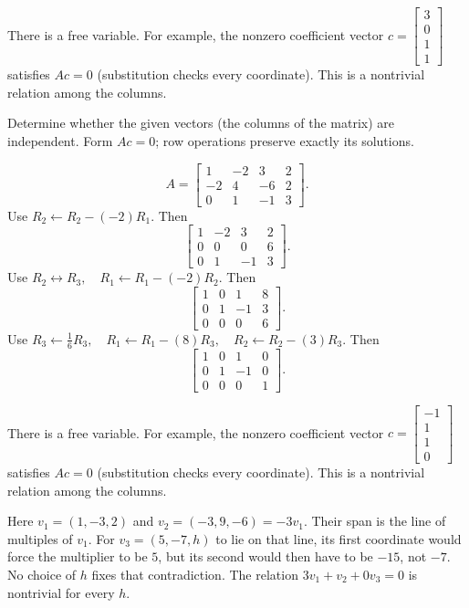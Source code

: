 There is a free variable. For example, the nonzero coefficient vector $c=\begin{bmatrix}3\\0\\1\\1\end{bmatrix}$ satisfies $Ac=0$ (substitution checks every coordinate). This is a nontrivial relation among the columns.



\goal Determine whether the given vectors (the columns of the matrix) are independent. Form $Ac=0$; row operations preserve exactly its solutions.

\[ A=\begin{bmatrix}1 & -2 & 3 & 2\\-2 & 4 & -6 & 2\\0 & 1 & -1 & 3\end{bmatrix}.\]
Use $R_{2}\leftarrow R_{2}-(-2)R_{1}$. Then
\[ \begin{bmatrix}1 & -2 & 3 & 2\\0 & 0 & 0 & 6\\0 & 1 & -1 & 3\end{bmatrix}.\]
Use $R_{2}\leftrightarrow R_{3},\quad R_{1}\leftarrow R_{1}-(-2)R_{2}$. Then
\[ \begin{bmatrix}1 & 0 & 1 & 8\\0 & 1 & -1 & 3\\0 & 0 & 0 & 6\end{bmatrix}.\]
Use $R_{3}\leftarrow \frac{1}{6}R_{3},\quad R_{1}\leftarrow R_{1}-(8)R_{3},\quad R_{2}\leftarrow R_{2}-(3)R_{3}$. Then
\[ \begin{bmatrix}1 & 0 & 1 & 0\\0 & 1 & -1 & 0\\0 & 0 & 0 & 1\end{bmatrix}.\]

There is a free variable. For example, the nonzero coefficient vector $c=\begin{bmatrix}-1\\1\\1\\0\end{bmatrix}$ satisfies $Ac=0$ (substitution checks every coordinate). This is a nontrivial relation among the columns.


Here $v_1=(1,-3,2)$ and $v_2=(-3,9,-6)=-3v_1$.
Their span is the line of multiples of $v_1$. For
$v_3=(5,-7,h)$ to lie on that line, its first coordinate would
force the multiplier to be $5$, but its second would then have to
be $-15$, not $-7$. No choice of $h$ fixes that contradiction.
The relation $3v_1+v_2+0v_3=0$ is nontrivial for every $h$.

